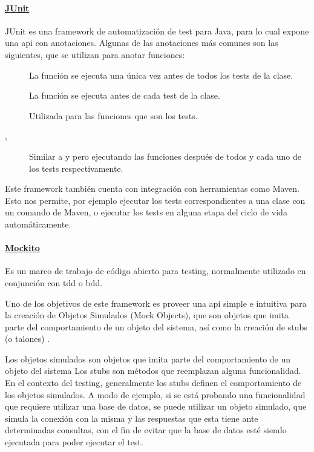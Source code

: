 \paragraph{\href{https://junit.org/}{JUnit}}\label{para:junit}
JUnit es una framework de automatización de test para Java, para lo cual expone una api con anotaciones. Algunas de las anotaciones más comunes son las siguientes, que se utilizan para anotar funciones:
\begin{description}
    \item[] La función se ejecuta una única vez antes de todos los tests de la clase.
    \item[] La función se ejecuta antes de cada test de la clase.
    \item[] Utilizada para las funciones que son los tests.
    \item[, ] Similar a  y  pero ejecutando las funciones después de todos y cada uno de los tests respectivamente.
\end{description}

Este framework también cuenta con integración con herramientas como Maven. Esto nos permite, por ejemplo ejecutar los tests correspondientes a una clase con un comando de Maven, o ejecutar los tests en alguna etapa del ciclo de vida automáticamente.

\paragraph{\href{https://site.mockito.org/}{Mockito}}\label{para:mockito}
Es un marco de trabajo de código abierto para testing, normalmente utilizado en conjunción con \acrfull{tdd} o \acrfull{bdd}.

Uno de los objetivos de este framework es proveer una \acrfull{api} simple e intuitiva para la creación de Objetos Simulados (Mock Objects), que son objetos que imita parte del comportamiento de un objeto del sistema, así como la creación de stubs (o talones) \cite{mockitoFeatures}.

Los objetos simulados son objetos que imita parte del comportamiento de un objeto del sistema Los stubs son métodos que reemplazan alguna funcionalidad. En el contexto del testing, generalmente los stubs definen el comportamiento de los objetos simulados.
A modo de ejemplo, si se está probando una funcionalidad que requiere utilizar una base de datos, se puede utilizar un objeto simulado, que simula la conexión con la misma y las respuestas que esta tiene ante determinadas consultas, con el fin de evitar que la base de datos esté siendo ejecutada para poder ejecutar el test.

